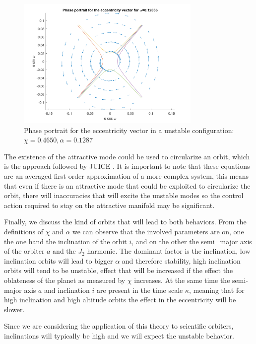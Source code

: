 \begin{figure}[h]
	\centering
	\includegraphics[height=2.5in]
	{figures/Europa200km01e60i/EccentricityPhasePortrait.png}
	\caption{Phase portrait for the eccentricity vector in a unstable configuration: $\chi = 0.4650, \alpha = 0.1287$}
	\label{fig:eccentricityPhasePortraitUnstable}
\end{figure}

The existence of the attractive mode could be used to circularize an orbit, which is the approach followed by JUICE \cite{esa2014juice}. It is important to note that these equations are an averaged first order approximation of a more complex system, this means that even if there is an attractive mode that could be exploited to circularize the orbit, there will inaccuracies that will excite the unstable modes so the control action required to stay on the attractive manifold may be significant.

Finally, we discuss the kind of orbits that will lead to both behaviors. From the definitions of $\chi$ and $\alpha$ we can observe that the involved parameters are on, one the one hand the inclination of the orbit $i$, and on the other the semi=major axis of the orbiter $a$ and the $J_2$ harmonic. The dominant factor is the inclination, low inclination orbits will lead to bigger $\alpha$ and therefore stability, high inclination orbits will tend to be unstable, effect that will be increased if the effect the oblateness of the planet as measured by $\chi$ increases. At the same time the semi-major axis $a$ and inclination $i$ are present in the time scale $\kappa$, meaning that for high inclination and high altitude orbits the effect in the eccentricity will be slower.

Since we are considering the application of this theory to scientific orbiters, inclinations will typically be high and we will expect the unstable behavior.